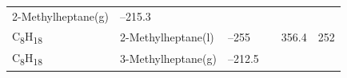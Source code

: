 \documentclass[
  9pt,
]{extbook}
\theoremstyle{definition}
\theoremstyle{definition}
\theoremstyle{definition}
\theoremstyle{remark}
\begin{document}
\begin{longtable}[]{@{}llllll@{}}
\begin{minipage}[t]{0.17\columnwidth}
2-Methylheptane(g)\strut
\end{minipage} & \begin{minipage}[t]{0.15\columnwidth}\raggedright
--215.3\strut
\end{minipage} & \begin{minipage}[t]{0.15\columnwidth}\raggedright
\strut
\end{minipage} & \begin{minipage}[t]{0.14\columnwidth}\raggedright
\strut
\end{minipage} & \begin{minipage}[t]{0.14\columnwidth}\raggedright
\strut
\end{minipage}\tabularnewline
\begin{minipage}[t]{0.07\columnwidth}\raggedright
C\textsubscript{8}H\textsubscript{18}\strut
\end{minipage} & \begin{minipage}[t]{0.17\columnwidth}\raggedright
2-Methylheptane(l)\strut
\end{minipage} & \begin{minipage}[t]{0.15\columnwidth}\raggedright
--255\strut
\end{minipage} & \begin{minipage}[t]{0.15\columnwidth}\raggedright
\strut
\end{minipage} & \begin{minipage}[t]{0.14\columnwidth}\raggedright
356.4\strut
\end{minipage} & \begin{minipage}[t]{0.14\columnwidth}\raggedright
252\strut
\end{minipage}\tabularnewline
\begin{minipage}[t]{0.07\columnwidth}\raggedright
C\textsubscript{8}H\textsubscript{18}\strut
\end{minipage} & \begin{minipage}[t]{0.17\columnwidth}\raggedright
3-Methylheptane(g)\strut
\end{minipage} & \begin{minipage}[t]{0.15\columnwidth}\raggedright
--212.5\strut
\end{minipage} & \begin{minipage}[t]{0.15\columnwidth}\raggedright
\strut
\end{minipage} & \begin{minipage}[t]{0.14\columnwidth}\raggedright
\strut
\end{minipage} & \begin{minipage}[t]{0.14\columnwidth}\raggedright

\end{minipage}
\end{longtable}
\end{document}
